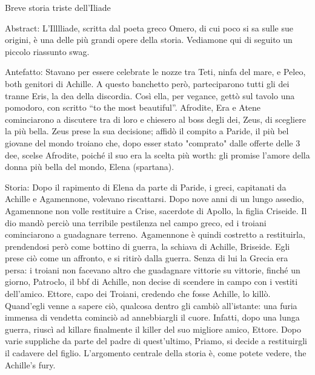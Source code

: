 \documentclass{article}
\begin{document}
Breve storia triste dell’Iliade

Abstract:
L'Illlliade, scritta dal poeta greco Omero, di cui poco si sa sulle sue
origini, è una delle più grandi opere della storia. Vediamone qui di seguito un
piccolo riassunto swag.

Antefatto:
Stavano per essere celebrate le nozze tra Teti, ninfa del mare, e Peleo, both
genitori di Achille. A questo banchetto però, parteciparono tutti gli dei
tranne Eris, la dea della discordia. Così ella, per vegance, gettò sul tavolo
una pomodoro, con scritto ``to the most beautiful''. Afrodite, Era e Atene
cominciarono a discutere tra di loro e chiesero al boss degli dei, Zeus, di
scegliere la più bella. Zeus prese la sua decisione; affidò il compito a
Paride, il più bel giovane del mondo troiano che, dopo esser stato "comprato" 
dalle offerte delle 3 dee, scelse Afrodite, poiché il suo era la scelta più
worth: gli promise l'amore della donna più bella del mondo, Elena (spartana).

Storia:
Dopo il rapimento di Elena da parte di Paride, i greci, capitanati da Achille e
Agamennone, volevano riscattarsi. Dopo nove anni di un lungo assedio,
Agamennone non volle restituire a Crise, sacerdote di Apollo, la figlia
Criseide. Il dio mandò perciò una terribile pestilenza nel campo greco, ed i
troiani cominciarono a guadagnare terreno. Agamennone è quindi costretto a
restituirla, prendendosi però come bottino di guerra, la schiava di Achille,
Briseide. Egli prese ciò come un affronto, e si ritirò dalla guerra. 
Senza di lui la Grecia era persa: i troiani non facevano altro che guadagnare
vittorie su vittorie, finché un giorno, Patroclo, il bbf di Achille, non decise
di scendere in campo con i vestiti dell'amico. Ettore, capo dei Troiani,
credendo che fosse Achille, lo killò. Quand'egli venne a sapere ciò, qualcosa
dentro gli cambiò all'istante: una furia immensa di vendetta cominciò ad
annebbiargli il cuore. Infatti, dopo una lunga guerra, riuscì ad killare
finalmente il killer del suo migliore amico, Ettore. Dopo varie suppliche da
parte del padre di quest'ultimo, Priamo, si decide a restituirgli il cadavere
del figlio. L'argomento centrale della storia è, come potete vedere, the
Achille's fury.
\end{document}
